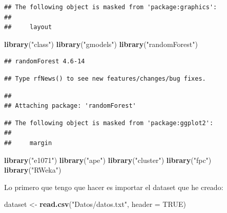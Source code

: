 \documentclass[]{article}
\newenvironment{Shaded}{\begin{snugshade}}{\end{snugshade}}
\newcommand{\KeywordTok}[1]{\textcolor[rgb]{0.13,0.29,0.53}{\textbf{#1}}}
\newcommand{\DataTypeTok}[1]{\textcolor[rgb]{0.13,0.29,0.53}{#1}}
\newcommand{\StringTok}[1]{\textcolor[rgb]{0.31,0.60,0.02}{#1}}
\newcommand{\OtherTok}[1]{\textcolor[rgb]{0.56,0.35,0.01}{#1}}
\newcommand{\NormalTok}[1]{#1}
\begin{document}
\begin{verbatim}
## The following object is masked from 'package:graphics':
## 
##     layout
\end{verbatim}

\begin{Shaded}
\begin{Highlighting}[]
\KeywordTok{library}\NormalTok{(}\StringTok{"class"}\NormalTok{)}
\KeywordTok{library}\NormalTok{(}\StringTok{"gmodels"}\NormalTok{)}
\KeywordTok{library}\NormalTok{(}\StringTok{"randomForest"}\NormalTok{)}
\end{Highlighting}
\end{Shaded}

\begin{verbatim}
## randomForest 4.6-14
\end{verbatim}

\begin{verbatim}
## Type rfNews() to see new features/changes/bug fixes.
\end{verbatim}

\begin{verbatim}
## 
## Attaching package: 'randomForest'
\end{verbatim}

\begin{verbatim}
## The following object is masked from 'package:ggplot2':
## 
##     margin
\end{verbatim}

\begin{Shaded}
\begin{Highlighting}[]
\KeywordTok{library}\NormalTok{(}\StringTok{"e1071"}\NormalTok{)}
\KeywordTok{library}\NormalTok{(}\StringTok{"ape"}\NormalTok{)}
\KeywordTok{library}\NormalTok{(}\StringTok{"cluster"}\NormalTok{)}
\KeywordTok{library}\NormalTok{(}\StringTok{"fpc"}\NormalTok{)}
\KeywordTok{library}\NormalTok{(}\StringTok{"RWeka"}\NormalTok{)}
\end{Highlighting}
\end{Shaded}

Lo primero que tengo que hacer es importar el dataset que he creado:

\begin{Shaded}
\begin{Highlighting}[]
\NormalTok{dataset <-}\StringTok{ }\KeywordTok{read.csv}\NormalTok{(}\StringTok{"Datos/datos.txt"}\NormalTok{, }\DataTypeTok{header =} \OtherTok{TRUE}\NormalTok{)}
\end{Highlighting}
\end{Shaded}
\end{document}
